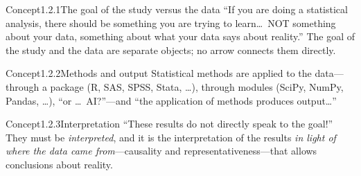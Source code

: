\documentclass[main.tex]{subfiles}
\begin{document}

\begin{ObjL}{Concept}{1.2.1}{The goal of the study versus the data}
``If you are doing a statistical analysis, there should be something you are trying to
learn\dots\ NOT something about your data, something about what your data says about
reality.'' The goal of the study and the data are separate objects; no arrow connects them
directly.
\end{ObjL}

\begin{ObjL}{Concept}{1.2.2}{Methods and output}
Statistical methods are applied to the data---through a package (R, SAS, SPSS, Stata, \dots),
through modules (SciPy, NumPy, Pandas, \dots), ``or \dots\ AI?''---and ``the application of
methods produces output\dots''
\end{ObjL}

\begin{ObjL}{Concept}{1.2.3}{Interpretation}
``These results do not directly speak to the goal!'' They must be \emph{interpreted}, and it is
the interpretation of the results \emph{in light of where the data came from}---causality and
representativeness---that allows conclusions about reality.
\end{ObjL}
\end{document}
